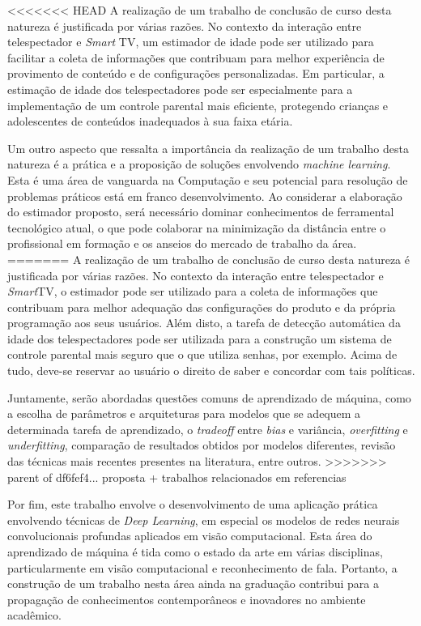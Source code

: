 <<<<<<< HEAD
A realização de um trabalho de conclusão de curso desta natureza é justificada por várias razões. No contexto da interação entre telespectador e \emph{Smart} TV, um estimador de idade pode ser utilizado para facilitar a coleta de informações que contribuam para melhor experiência de provimento de conteúdo e de configurações personalizadas. Em particular, a estimação de idade dos telespectadores pode ser especialmente para a implementação de um controle parental mais eficiente, protegendo crianças e adolescentes de conteúdos inadequados à sua faixa etária.

Um outro aspecto que ressalta a importância da realização de um trabalho desta natureza é a prática e a proposição de soluções envolvendo \emph{machine learning}. Esta é uma área de vanguarda na Computação e seu potencial para resolução de problemas práticos está em franco desenvolvimento. Ao considerar a elaboração do estimador proposto, será necessário dominar conhecimentos de  ferramental tecnológico atual, o que pode colaborar na minimização da distância entre o profissional em formação e os anseios do mercado de trabalho da área.
=======
A realização de um trabalho de conclusão de curso desta natureza é justificada por várias razões. No contexto da interação entre telespectador e \emph{Smart}TV, o estimador pode ser utilizado para a coleta de informações que contribuam para melhor adequação das configurações do produto e da própria programação aos seus usuários. Além disto, a tarefa de detecção automática da idade dos telespectadores pode ser utilizada para a construção um sistema de controle parental mais seguro que o que utiliza senhas, por exemplo. Acima de tudo, deve-se reservar ao usuário o direito de saber e concordar com tais políticas.

Juntamente, serão abordadas questões comuns de aprendizado de máquina, como a escolha de parâmetros e arquiteturas para modelos que se adequem a determinada tarefa de aprendizado, o \emph{tradeoff} entre \emph{bias} e variância, \emph{overfitting} e \emph{underfitting}, comparação de resultados obtidos por modelos diferentes, revisão das técnicas mais recentes presentes na literatura, entre outros.
>>>>>>> parent of df6fef4... proposta + trabalhos relacionados em referencias

Por fim, este trabalho envolve o desenvolvimento de uma aplicação prática envolvendo técnicas de \emph{Deep Learning}, em especial os modelos de redes neurais convolucionais profundas aplicados em visão computacional. Esta área do aprendizado de máquina é tida como o estado da arte em várias disciplinas, particularmente em visão computacional e reconhecimento de fala. Portanto, a construção de um trabalho nesta área ainda na graduação contribui para a propagação de conhecimentos contemporâneos e inovadores no ambiente acadêmico.
